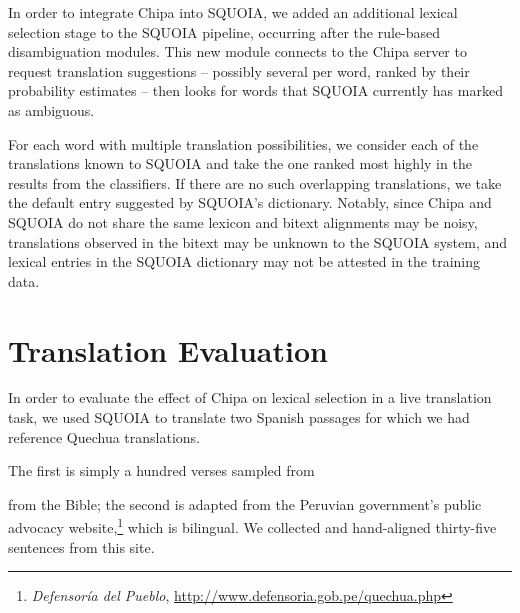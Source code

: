 In order to integrate Chipa into SQUOIA, we added an additional lexical
selection stage to the SQUOIA pipeline, occurring after the rule-based
disambiguation modules. This new module connects to the Chipa server to request
translation suggestions -- possibly several per word, ranked by their
probability estimates -- then looks for words that SQUOIA currently has marked
as ambiguous.

For each word with multiple translation possibilities, we consider each of the
translations known to SQUOIA and take the one ranked most highly in the
results from the classifiers. If there are no such overlapping translations, we
take the default entry suggested by SQUOIA's dictionary.
Notably, since Chipa and SQUOIA do not share the same lexicon and bitext alignments
may be noisy, translations
observed in the bitext may be unknown to the SQUOIA system, and lexical entries in the
SQUOIA dictionary may not be attested in the training data.


\section{Translation Evaluation}
In order to evaluate the effect of Chipa on lexical selection in a live
translation task, we used SQUOIA to translate two Spanish passages for which we
had reference Quechua translations.

The first is simply a hundred verses sampled from 


from the Bible; the second is adapted from the Peruvian government's public
advocacy website,\footnote{\emph{Defensoría del Pueblo},
\url{http://www.defensoria.gob.pe/quechua.php}} which is bilingual.
We collected and hand-aligned thirty-five sentences from this site.

